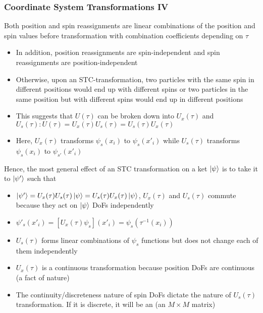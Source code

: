 \documentclass[8pt,t,mathserif,aspectratio=169]{beamer}
\begin{document}
\begin{frame}
  \frametitle{Coordinate System Transformations IV}
  \vspace{1mm}
  Both position and spin reassignments are linear combinations of the position and spin values before transformation with combination coefficients depending on $\tau$
  \begin{itemize}
    \item In addition, position reassignments are spin-independent and spin reassignments are position-independent
    \item Otherwise, upon an STC-transformation, two particles with the same spin in different positions would end up with different spins or two particles in the same position but with different spins would end up in different positions
    \item This suggests that $U(\tau)$ can be broken down into $U_x(\tau)$ and $U_s(\tau) : U(\tau) = U_x(\tau) U_s(\tau) = U_s(\tau) U_x(\tau)$
    \item Here, $U_x(\tau)$ transforms $\psi_s(x_i)$ to $\psi_s(x'_i)$ while $U_s(\tau)$ transforms $\psi_s(x_i)$ to $\psi_{s'}(x'_i)$ 
  \end{itemize}
  Hence, the most general effect of an STC transformation on a ket $\ket{\psi}$ is to take it to $\ket{\psi'}$ such that
  \begin{itemize}
    \item $\ket{\psi'} = U_x(\tau) U_s(\tau) \ket{\psi} = U_s(\tau) U_x(\tau) \ket{\psi}$, $U_x(\tau)$ and $U_s(\tau)$ commute because they act on $\ket{\psi}$ DoFs independently 
    \item $\psi'_s(x'_i) = [U_x(\tau) \psi_s](x'_i) = \psi_s(\tau^{-1}(x_i))$
    \item $U_s(\tau)$ forms linear combinations of $\psi_s$ functions but does not change each of them independently
    \item $U_x(\tau)$ is a continuous transformation because position DoFs are continuous (a fact of nature)
    \item The continuity/discreteness nature of spin DoFs dictate the nature of $U_s(\tau)$ transformation. If it is discrete, it will be an (an $M \times M$ matrix)
  \end{itemize}
\end{frame}
\end{document}
